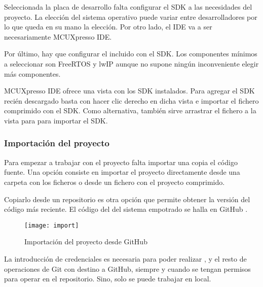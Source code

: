 
Seleccionada la placa de desarrollo falta configurar el SDK a las necesidades
del proyecto. La elección del sistema operativo puede variar entre
desarrolladores por lo que queda en su mano la elección. Por otro lado, el IDE
va a ser necesariamente MCUXpresso IDE.

Por último, hay que configurar el  incluido con el SDK.
Los componentes mínimos a seleccionar son FreeRTOS y lwIP aunque no supone
ningún inconveniente elegir más componentes.


MCUXpresso IDE ofrece una vista con los SDK instalados. Para agregar el SDK
recién descargado basta con hacer clic derecho en dicha vista e importar el
fichero comprimido con el SDK. Como alternativa, también sirve arrastrar el
fichero a la vista para para importar el SDK.



\subsubsection{Importación del proyecto} \label{sec:importacion-proj}
Para empezar a trabajar con el proyecto falta importar una copia el código
fuente. Una opción consiste en importar el proyecto directamente desde una
carpeta con los ficheros o desde un fichero con el proyecto comprimido.

Copiarlo desde un repositorio es otra opción que permite obtener la versión
del código más reciente. El código del \sw{} del sistema empotrado se halla en
GitHub \cite{webpage:repo-se}.

\begin{figure}[!h]
  \centering
  \texttt{[image: import]}
  \caption{Importación del proyecto desde GitHub} \label{fig:import}
\end{figure}

La introducción de credenciales es necesaria para poder realizar
,  y el resto de operaciones de Git
con destino a GitHub, siempre y cuando se tengan permisos para operar en el
repositorio. Sino, solo se puede trabajar en local.

